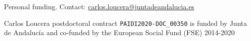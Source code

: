 \documentclass[compress,ignorenonframetext,aspectratio=1610]{beamer}
\begin{document}
	\begin{frame}{Personal funding. Contact: \url{carlos.loucera@juntadeandalucia.es}}


		\vspace{0.3cm}

		Carlos Loucera postdoctoral contract \texttt{PAIDI2020-DOC\_00350} is funded by Junta de Andalucía and co-funded by the European Social Fund (FSE) 2014-2020

		\vspace{0.3cm}

		\begin{center}
		\end{center}
	\end{frame}

	\begin{frame}
		\vspace*{-1pt}
	\end{frame}
\end{document}
